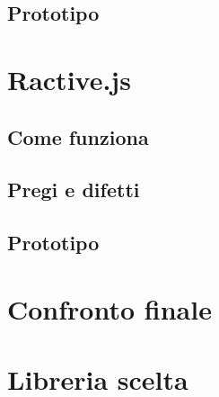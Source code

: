\subsection{Prototipo}


\FloatBarrier
\section{Ractive.js}

\subsection{Come funziona}

\subsection{Pregi e difetti}

\subsection{Prototipo}


\clearpage
\section{Confronto finale}

\FloatBarrier
\section{Libreria scelta}

